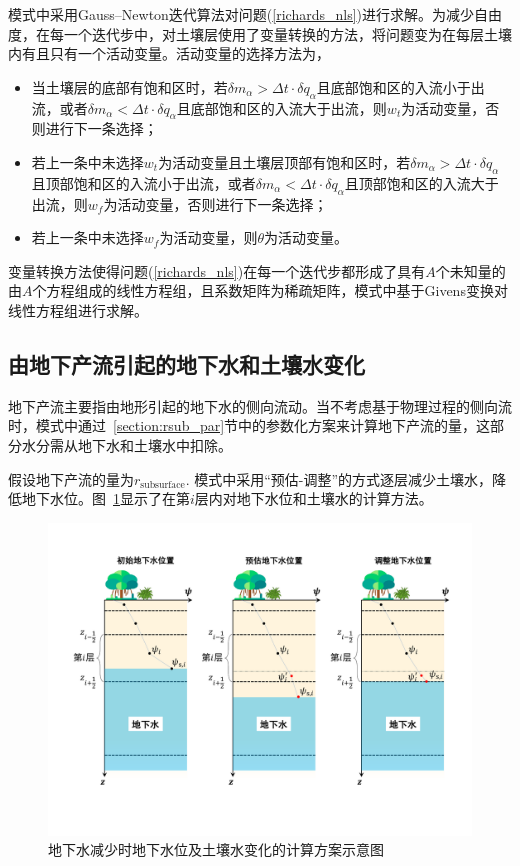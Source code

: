 模式中采用Gauss--Newton迭代算法对问题(\ref{richards_nls})进行求解。为减少自由度，在每一个迭代步中，对土壤层使用了变量转换的方法，将问题变为在每层土壤内有且只有一个活动变量。活动变量的选择方法为，
\begin{itemize}
    \item 当土壤层的底部有饱和区时，若$\delta m_{\alpha}>\Delta t \cdot \delta q_{\alpha}$且底部饱和区的入流小于出流，或者$\delta m_{\alpha}<\Delta t \cdot \delta q_{\alpha}$且底部饱和区的入流大于出流，则$w_t$为活动变量，否则进行下一条选择；
    \item 若上一条中未选择$w_t$为活动变量且土壤层顶部有饱和区时，若$\delta m_{\alpha}>\Delta t \cdot \delta q_{\alpha}$且顶部饱和区的入流小于出流，或者$\delta m_{\alpha}<\Delta t \cdot \delta q_{\alpha}$且顶部饱和区的入流大于出流，则$w_f$为活动变量，否则进行下一条选择；
    \item 若上一条中未选择$w_f$为活动变量，则$\theta$为活动变量。
\end{itemize}

变量转换方法使得问题(\ref{richards_nls})在每一个迭代步都形成了具有$A$个未知量的由$A$个方程组成的线性方程组，且系数矩阵为稀疏矩阵，模式中基于Givens变换对线性方程组进行求解。

\subsection{由地下产流引起的地下水和土壤水变化} \label{sec:change_of_zwt_vsf}

地下产流主要指由地形引起的地下水的侧向流动。当不考虑基于物理过程的侧向流时，模式中通过~\ref{section:rsub_par}节中的参数化方案来计算地下产流的量，这部分水分需从地下水和土壤水中扣除。

假设地下产流的量为$r_{\mathrm{subsurface}}$. 模式中采用“预估-调整”的方式逐层减少土壤水，降低地下水位。图~\ref{fig:地下水变化}显示了在第$i$层内对地下水位和土壤水的计算方法。

{
\begin{figure}[htbp]
\centering
\includegraphics[width=\textwidth]{Figures/植被冠层和土壤水分/地下水变化.pdf}
\caption{地下水减少时地下水位及土壤水变化的计算方案示意图}
\label{fig:地下水变化}
\end{figure}
}

